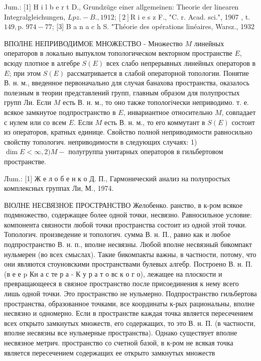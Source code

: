 \documentclass[10pt]{article}
\begin{document}
Jum.: [1] H i l b e r t D., Grundzüge einer allgemeinen: Theorie der linearen Integralgleichungen, $L p z .-B ., 1912 ;[2] \mathrm{R}$ i e s z F., "C. r. Acad. sci.", 1907 , t. $149, \mathrm{p}$. $974-77$; [3] B a n a c h S. "Théorie des opérations linéaires, Warsz., 1932



ВПОЛНЕ НЕПРИВОДИМОЕ МНОЖЕСТВО - Множество $M$ линейных операторов в локально выпуклом топологическом векторном пространстве $E$, всюду плотное в алгебре $S(E)$ всех слабо непрерывных линейных операторов в $E$; при этом $S(E)$ рассматривается в слабой операторной топологии. Понятие В. н. м., введенное первоначально для случая банахова пространства, оказалось полезным в теории представлений групп, главным образом для полупростых групп Ли. Если $M$ есть В. н. м., то оно также топологічески неприводимо. т. е. всякое замкнутое подпространство в $E$, инвариантное относительно $M$, совпадает с нулем или со всем $E$. Если $M$ есть В. н. м., то его коммутант в $S(E)$ состоит из операторов, кратных единице. Свойство полной неприводимости равносильно свойству топологич. неприводимости в следующих случаях: 1) $\operatorname{dim} E<\infty, 2) M-$ полугруппа унитарных операторов в гильбертовом пространстве.



Лum.: [1] Ж е л о б е н к о Д. П., Гармонический анализ на полупростых комплексных группах Ли, М., 1974.



ВІОЛНЕ НЕСВЯЗНОЕ ПРОСТРАНСТВО Желобенко. ранство, в к-ром всякое подмножество, содержащее более одной точки, несвязно. Равносильное условие: компонента связности любой точки пространства состоит из одной этой точки. Топологич. произведение и топологич. сумма В. н. П., равно как и любое подпространство В. н. п., вполне несвязны. Любой вполне несвязный бикомпакт нульмерен (во всех смыслах). Такие бикомпакты важны, в частности, потому, что они являются стоуновскими пространствами булевых алгебр. Построено В. н. П. (в е е $\mathrm{p}$ Кн а с те р а - К у р а т о вс к о г о), лежащее на плоскости и превращающееся в связное пространство после присоединения к нему всего лишь одной точки. Это пространство не нульмерно. Подпространство гильбертова пространства, образованное точками, все координаты к-рых рациональны, вполне несвязно и одномерно. Если в пространстве каждая точка является пересечением всех открыто замкнутых множеств, его содержащих, то это В. н. П. (в частности, вполне несвязны все нульмерные пространства). Однако существует вполне несвязное метрич. пространство со счетной базой, в к-ром не всякая точка является пересечением содержащих ее открыто замкнутых множеств
\end{document}
